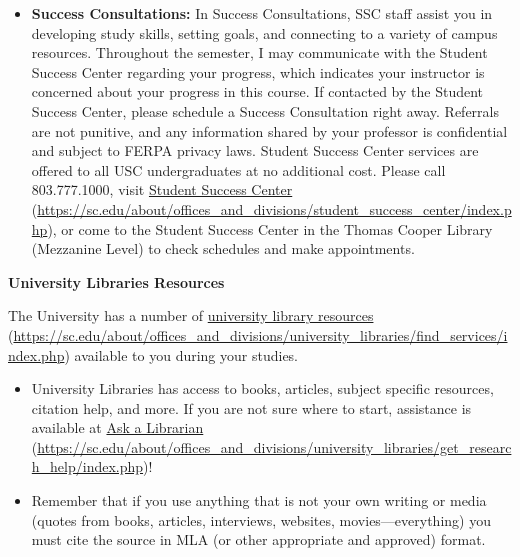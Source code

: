 \documentclass[11pt,letterpaper]{article}
\begin{document}
\begin{itemize}
	\item {\bfseries Success Consultations:} In Success Consultations, SSC staff assist you in developing study skills, setting goals, and connecting to a variety of campus resources. Throughout the semester, I may communicate with the Student Success Center regarding your progress, which indicates your instructor is concerned about your progress in this course. If contacted by the Student Success Center, please schedule a Success Consultation right away. Referrals are not punitive, and any information shared by your professor is confidential and subject to FERPA privacy laws. Student Success Center services are offered to all USC undergraduates at no additional cost. Please call 803.777.1000, visit \href{https://sc.edu/about/offices\_and\_divisions/student\_success\_center/index.php}{Student Success Center} (\url{https://sc.edu/about/offices\_and\_divisions/student\_success\_center/index.php}), or come to the Student Success Center in the Thomas Cooper Library (Mezzanine Level) to check schedules and make appointments.
	\end{itemize} \pvspace{0.1cm}





\newpage




	
{\bfseries University Libraries Resources} \par
The University has a number of \href{https://sc.edu/about/offices\_and\_divisions/university\_libraries/find\_services/index.php}{university library resources} (\url{https://sc.edu/about/offices\_and\_divisions/university\_libraries/find\_services/index.php}) available to you during your studies.
	\begin{itemize}
	\item University Libraries has access to books, articles, subject specific resources, citation help, and more. If you are not sure where to start, assistance is available at \href{https://sc.edu/about/offices\_and\_divisions/university\_libraries/get\_research\_help/index.php}{Ask a Librarian} (\url{https://sc.edu/about/offices\_and\_divisions/university\_libraries/get\_research\_help/index.php})!
	\item Remember that if you use anything that is not your own writing or media (quotes from books, articles, interviews, websites, movies---everything) you must cite the source in MLA (or other appropriate and approved) format.
	\end{itemize} \pvspace{0.1cm}
\end{document}
